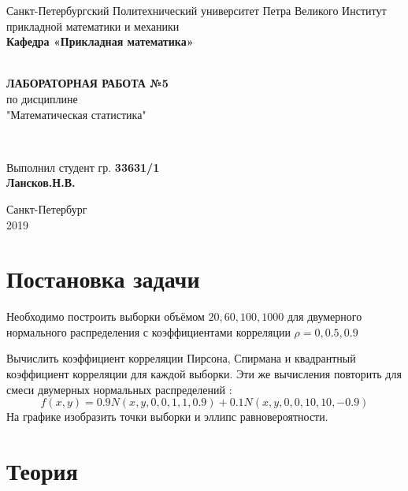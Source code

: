 \documentclass[12pt]{article}
\renewcommand{\listoffigures}{\begingroup  %
\tocsection
\tocfile{\listfigurename}{lof}
\endgroup}
\renewcommand{\listoftables}{\begingroup  %
\tocsection
\tocfile{\listtablename}{lot}
\endgroup}
\begin{document}
\begin{titlepage}
	\center
		Санкт-Петербургский Политехнический 
		университет Петра Великого
		Институт прикладной математики и механики
		\\ \textbf{Кафедра «Прикладная математика»}

	\vfill ~
	\textbf{
		\\ \large ЛАБОРАТОРНАЯ РАБОТА №5
	}
	\\	по дисциплине 
	\\	"Математическая статистика"

	\vfill ~

	Выполнил студент гр. \textbf{33631/1} \\
	\textbf{Лансков.Н.В.} \\ 

\vfill

{\large}	Санкт-Петербург
\\ 2019
\end{titlepage}


\tableofcontents 
\newpage
\listoffigures
\newpage
\listoftables
\newpage

\section{Постановка задачи}
Необходимо построить выборки объёмом $20, 60, 100, 1000$ для двумерного нормального распределения с коэффициентами корреляции $\rho = 0, 0.5, 0.9$

Вычислить коэффициент корреляции Пирсона, Спирмана и квадрантный коэффициент корреляции для каждой выборки. Эти же вычисления повторить для смеси двумерных нормальных распределений \cite{mix}: 
\begin{equation}
    f(x,y) = 0.9N(x,y,0,0,1,1,0.9)+0.1N(x,y,0,0,10,10,-0.9)
\end{equation}
На графике изобразить точки выборки и эллипс равновероятности.

\section{Теория}
\end{document}
